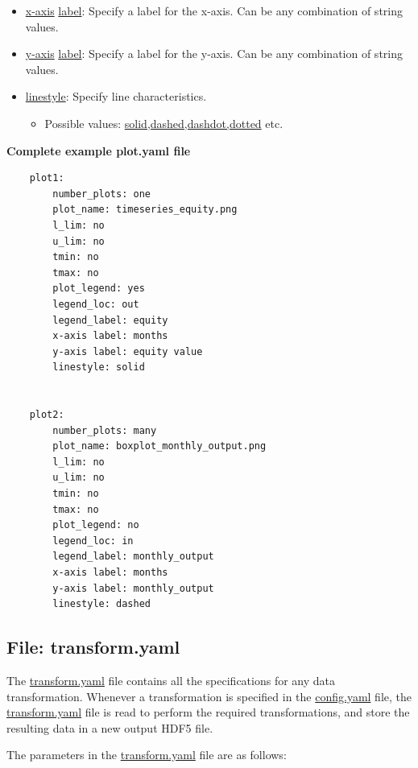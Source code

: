 \documentclass[10pt,a4paper]{article}
\begin{document}
\begin{itemize}
\item \url{x-axis} \url{label}: Specify a label for the x-axis. Can be any combination of string values.

\item \url{y-axis} \url{label}: Specify a label for the y-axis. Can be any combination of string values.

\item \url{linestyle}: Specify line characteristics. 
\begin{itemize}
\item Possible values: \url{solid,dashed,dashdot,dotted} etc.
\end{itemize}

\end{itemize}

\bigskip
\textbf{Complete example plot.yaml file}

\begin{lstlisting}
    plot1:
        number_plots: one
        plot_name: timeseries_equity.png
        l_lim: no
        u_lim: no
        tmin: no
        tmax: no
        plot_legend: yes
        legend_loc: out
        legend_label: equity
        x-axis label: months
        y-axis label: equity value
        linestyle: solid
        
    
    plot2:
        number_plots: many
        plot_name: boxplot_monthly_output.png
        l_lim: no
        u_lim: no
        tmin: no
        tmax: no
        plot_legend: no
        legend_loc: in
        legend_label: monthly_output
        x-axis label: months
        y-axis label: monthly_output
        linestyle: dashed
\end{lstlisting}

\subsection{File: transform.yaml}

The \url{transform.yaml} file contains all the specifications for any data transformation. Whenever a transformation is specified in the \url{config.yaml} file, the \url{transform.yaml} file is read to perform the required transformations, and store the resulting data in a new output HDF5 file.

\bigskip
The parameters in the \url{transform.yaml} file are as follows:
\end{document}
